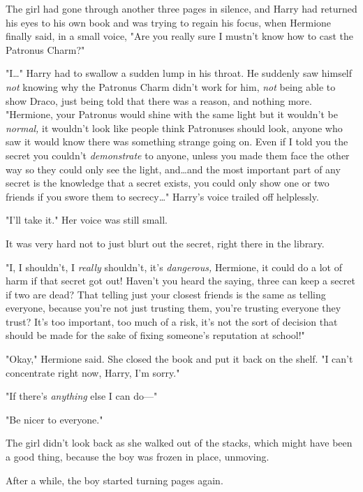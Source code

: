 The girl had gone through another three pages in silence, and Harry had
returned his eyes to his own book and was trying to regain his focus, when
Hermione finally said, in a small voice, "Are you really sure I mustn’t know
how to cast the Patronus Charm?"

"I…" Harry had to swallow a sudden lump in his throat. He suddenly saw
himself \emph{not} knowing why the Patronus Charm didn’t work for him,
\emph{not} being able to show Draco, just being told that there was a reason,
and nothing more. "Hermione, your Patronus would shine with the same light but
it wouldn’t be \emph{normal,} it wouldn’t look like people think Patronuses
should look, anyone who saw it would know there was something strange going on.
Even if I told you the secret you couldn’t \emph{demonstrate} to anyone, unless
you made them face the other way so they could only see the light, and…and
the most important part of any secret is the knowledge that a secret
exists, you could only show one or two friends if you swore them to
secrecy…" Harry’s voice trailed off helplessly.

"I’ll take it." Her voice was still small.

It was very hard not to just blurt out the secret, right there in the library.

"I, I shouldn’t, I \emph{really} shouldn’t, it’s \emph{dangerous,} Hermione, it
could do a lot of harm if that secret got out! Haven’t you heard the saying,
three can keep a secret if two are dead? That telling just your closest friends
is the same as telling everyone, because you’re not just trusting them, you’re
trusting everyone they trust? It’s too important, too much of a risk, it’s not
the sort of decision that should be made for the sake of fixing someone’s
reputation at school!"

"Okay," Hermione said. She closed the book and put it back on the shelf. "I
can’t concentrate right now, Harry, I’m sorry."

"If there’s \emph{anything} else I can do—"

"Be nicer to everyone."

The girl didn’t look back as she walked out of the stacks, which might have
been a good thing, because the boy was frozen in place, unmoving.

After a while, the boy started turning pages again.
